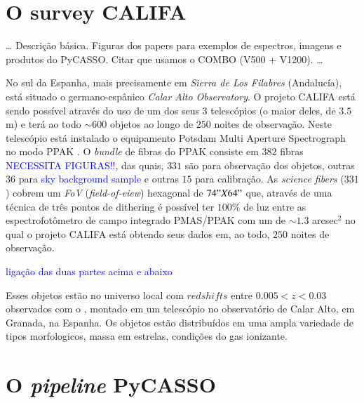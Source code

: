 \section{O survey CALIFA}
\label{sec:CALePyC:Apresent}

\ldots
Descrição básica. Figuras dos papers para exemplos de espectros, imagens e 
produtos do PyCASSO. Citar que usamos o COMBO (V500 + V1200).
\ldots

No sul da Espanha, mais precisamente em {\em Sierra de Los Filabres}
(Andalucía), está situado o germano-espânico {\em Calar Alto Observatory}. O
projeto CALIFA está sendo possível através do uso de um dos seus $3$ telescópios
(o maior deles, de $3.5$m) e terá ao todo $\sim 600$ objetos ao longo de $250$
noites de observação. Neste telescópio está instalado o equipamento Potsdam
Multi Aperture Spectrograph \citep[PMAS; ][]{Roth2005} no modo PPAK
\citep{Verheijen2004, Kelz2006}. O {\em bundle} de fibras do PPAK consiste em
$382$ fibras \ojo \textcolor{blue}{NECESSITA FIGURAS!!}, das quais, $331$ são
para observação dos objetos, outras $36$ para \ojo \textcolor{blue}{sky
background sample} e outras $15$ para calibração. As {\em science fibers}
($331$) cobrem um {\em FoV} ({\em field-of-view}) hexagonal de $74" X 64"$ que,
através de uma técnica de três pontos de dithering \ojo \citneed é possível
ter $100\%$ de luz entre as espectrofotômetro de campo integrado PMAS/PPAK com
um  de $\sim1.3$ arcsec$^2$ no qual o projeto CALIFA está obtendo seus dados
em, ao todo, $250$ noites de observação.

\ojo \textcolor{blue}{ligação das duas partes acima e abaixo}
 
Esses objetos estão no universo local com $redshifts$ entre $0.005 < z < 0.03$
observados com o , montado em um telescópio no
observatório de Calar Alto, em Granada, na Espanha. Os objetos estão
distribuídos em uma ampla variedade de tipos morfologicos, massa em estrelas,
condições do gas ionizante.


\section{O {\em pipeline} PyCASSO}
\label{sec:CALePyC:PyCASSO}

